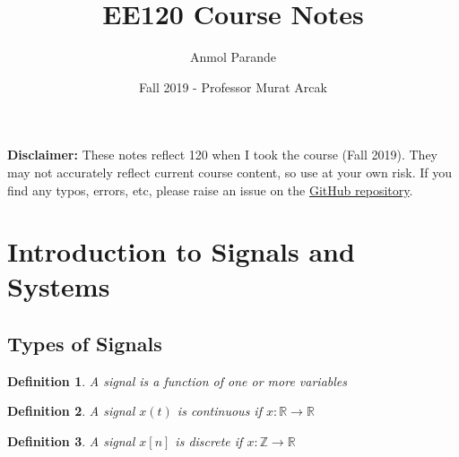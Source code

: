 \documentclass{article}
\newtheorem{definition}{Definition}
\begin{document}
\title{EE120 Course Notes}
\author{Anmol Parande}
\date{Fall 2019 - Professor Murat Arcak}
\maketitle
\textbf{Disclaimer: }These notes reflect 120 when I took the course (Fall 2019). They may not accurately reflect current course content, so use at your own risk.
If you find any typos, errors, etc, please raise an issue on the \href{https://github.com/parandea17/BerkeleyNotes}{GitHub repository}.\\
\tableofcontents
\newpage
\section{Introduction to Signals and Systems}
\subsection{Types of Signals}
\begin{definition}
    A signal is a function of one or more variables
\end{definition}
\begin{definition}
    A signal $x(t)$ is continuous if $x: \mathbb{R} \rightarrow \mathbb{R}$
\end{definition}
\begin{definition}
    A signal $x[n]$ is discrete if $x: \mathbb{Z} \rightarrow \mathbb{R}$
\end{definition}
\end{document}
